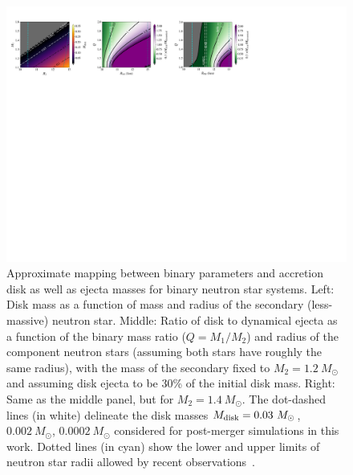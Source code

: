 \begin{landscape}
\begin{figure}[t]
  \centering
  \includegraphics[width=22cm]{figures/kilonova/BNS_parameters_plot.pdf}
\caption{Approximate mapping between binary parameters and accretion disk as well as ejecta masses for binary neutron star systems. Left: Disk mass as a function of mass and radius of the secondary (less-massive) neutron star. Middle: Ratio of disk to dynamical ejecta as a function of the binary mass ratio ($Q = M_1/M_2$) and radius of the component neutron stars (assuming both stars have roughly the same radius), with the mass of the secondary fixed to $M_2 = 1.2~M_\odot$ and assuming disk ejecta to be 30\% of the initial disk mass. Right: Same as the middle panel, but for $M_2 = 1.4~M_\odot$. The dot-dashed lines (in white) delineate the disk masses $M_{\rm disk} = 0.03~M_\odot$, $0.002~M_\odot$, $0.0002~M_\odot$ considered for post-merger simulations in this work. Dotted lines (in cyan) show the lower and upper limits of neutron star radii allowed by recent observations~\cite{De:2018uhw,capano_stringent_2020,Miller:2019cac,Riley:2019yda,Landry:2020vaw}.\label{fig:bns_parameters}}
\vspace{5mm}
\end{figure}
\end{landscape}

